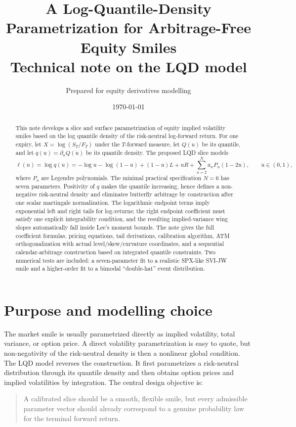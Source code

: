 \documentclass[11pt]{article}
\title{A Log-Quantile-Density Parametrization for Arbitrage-Free Equity Smiles\\\large Technical note on the LQD model}
\author{Prepared for equity derivatives modelling}
\date{\today}
\newcommand{\1}{\mathbf{1}}
\begin{document}
\maketitle

\begin{abstract}
This note develops a slice and surface parametrization of equity implied volatility smiles based on the log quantile density of the risk-neutral log-forward return.  For one expiry, let $X=\log(S_T/F_T)$ under the $T$-forward measure, let $Q(u)$ be its quantile, and let $q(u)=\partial_u Q(u)$ be its quantile density.  The proposed LQD slice models
\[
\ell(u)=\log q(u)=-\log u-\log(1-u)+(1-u)L+uR+\sum_{n=2}^{N}a_nP_n(1-2u),
\qquad u\in(0,1),
\]
where $P_n$ are Legendre polynomials.  The minimal practical specification $N=6$ has seven parameters.  Positivity of $q$ makes the quantile increasing, hence defines a non-negative risk-neutral density and eliminates butterfly arbitrage by construction after one scalar martingale normalization.  The logarithmic endpoint terms imply exponential left and right tails for log-returns; the right endpoint coefficient must satisfy one explicit integrability condition, and the resulting implied-variance wing slopes automatically fall inside Lee's moment bounds.  The note gives the full coefficient formulas, pricing equations, tail derivations, calibration algorithm, ATM orthogonalization with actual level/skew/curvature coordinates, and a sequential calendar-arbitrage construction based on integrated quantile constraints.  Two numerical tests are included: a seven-parameter fit to a realistic SPX-like SVI-JW smile and a higher-order fit to a bimodal ``double-hat'' event distribution.
\end{abstract}

\tableofcontents
\newpage

\section{Purpose and modelling choice}

The market smile is usually parametrized directly as implied volatility, total variance, or option price.  A direct volatility parametrization is easy to quote, but non-negativity of the risk-neutral density is then a nonlinear global condition.  The LQD model reverses the construction.  It first parametrizes a risk-neutral distribution through its quantile density and then obtains option prices and implied volatilities by integration.  The central design objective is:
\begin{quote}
A calibrated slice should be a smooth, flexible smile, but every admissible parameter vector should already correspond to a genuine probability law for the terminal forward return.
\end{quote}
\end{document}
